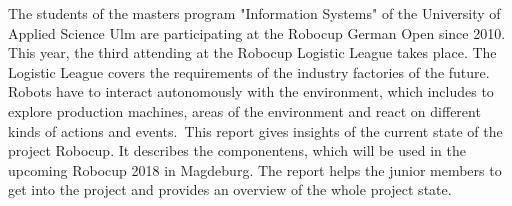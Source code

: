 The students of the masters program "Information Systems" of the University of Applied Science Ulm are participating at the Robocup German Open since 2010. This year, the third attending at the Robocup Logistic League takes place. The Logistic League covers the requirements of the industry factories of the future. Robots have to interact autonomously with the environment, which includes to explore production machines, areas of the environment and react on different kinds of actions and events.\
This report gives insights of the current state of the project Robocup. It describes the componentens, which will be used in the upcoming Robocup 2018 in Magdeburg. The report helps the junior members to get into the project and provides an overview of the whole project state.

